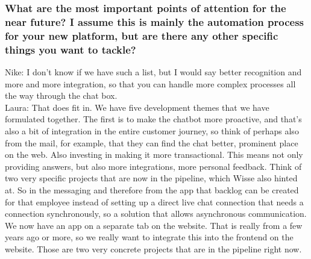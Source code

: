 \begin{appendices}
	\subsubsection{What are the most important points of attention for the near future? I
		assume this is mainly the automation process for your new platform, but are
		there any other specific things you want to tackle?}
	Nike: I don't know if we have such a list, but I would say better recognition and more and more integration, so that you can handle more complex processes all the way through the chat box.\\
	\break
	Laura: That does fit in. We have five development themes that we have formulated together. The first is to make the chatbot more proactive, and that's also a bit of integration in the entire customer journey, so think of perhaps also from the mail, for example, that they can find the chat better, prominent place on the web. Also investing in making it more transactional. This means not only providing answers, but also more integrations, more personal feedback. Think of two very specific projects that are now in the pipeline, which Wisse also hinted at. So in the messaging and therefore from the app that backlog can be created for that employee instead of setting up a direct live chat connection that needs a connection synchronously, so a solution that allows asynchronous communication. We now have an app on a separate tab on the website. That is really from a few years ago or more, so we really want to integrate this into the frontend on the website. Those are two very concrete projects that are in the pipeline right now.\\
	\break

\end{appendices}
